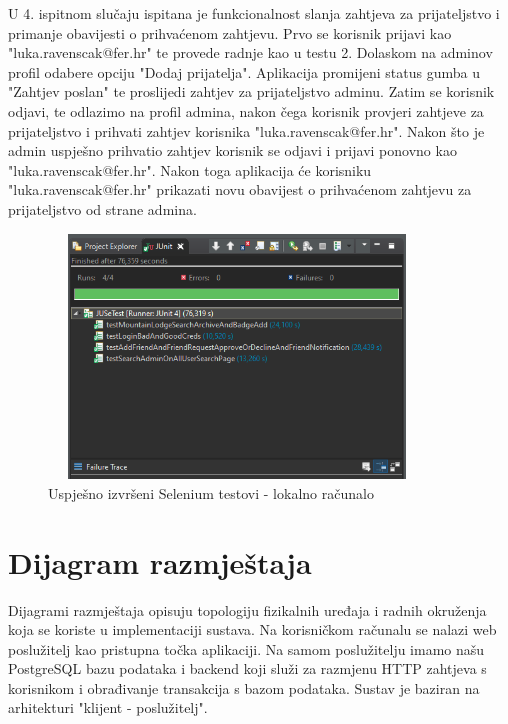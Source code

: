  		U 4. ispitnom slučaju ispitana je funkcionalnost slanja zahtjeva za prijateljstvo i primanje obavijesti o prihvaćenom zahtjevu. Prvo se korisnik prijavi kao "luka.ravenscak@fer.hr" te provede radnje kao u testu 2. Dolaskom na adminov profil odabere opciju "Dodaj prijatelja". Aplikacija promijeni status gumba u "Zahtjev poslan" te proslijedi zahtjev za prijateljstvo adminu. Zatim se korisnik odjavi, te odlazimo na profil admina, nakon čega korisnik provjeri zahtjeve za prijateljstvo i prihvati zahtjev korisnika "luka.ravenscak@fer.hr".
 		Nakon što je admin uspješno prihvatio zahtjev korisnik se odjavi i prijavi ponovno kao "luka.ravenscak@fer.hr". Nakon toga aplikacija će korisniku "luka.ravenscak@fer.hr" prikazati novu obavijest o prihvaćenom zahtjevu za prijateljstvo od strane admina. 
 		
		
		\begin{figure}[H]
			\includegraphics[scale=0.6, height=65mm, width=100mm]{slike/test_results.png} %
			\centering
			\caption{Uspješno izvršeni Selenium testovi - lokalno računalo}
			\label{fig:test_results}
		\end{figure}
		
			\eject 
		
		
		\section{Dijagram razmještaja}
			
			Dijagrami razmještaja opisuju topologiju fizikalnih uređaja i radnih okruženja koja se koriste u implementaciji sustava. Na korisničkom računalu se nalazi web poslužitelj kao pristupna točka aplikaciji. Na samom poslužitelju imamo našu PostgreSQL bazu podataka i backend koji služi za razmjenu HTTP zahtjeva s korisnikom i obrađivanje transakcija s bazom podataka. Sustav je baziran na arhitekturi "klijent - poslužitelj".
			 
